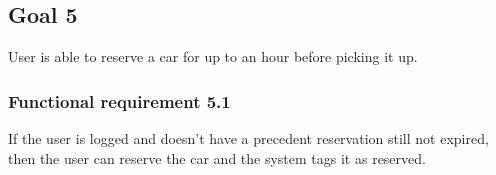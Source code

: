 \subsection{Goal 5}
User is able to reserve a car for up to an hour before picking it up.

\setcounter{secnumdepth}{3}
\subsubsection{Functional requirement 5.1}
If the user is logged and doesn’t have a precedent reservation still not expired, then the user can reserve the car and the system tags it as reserved.